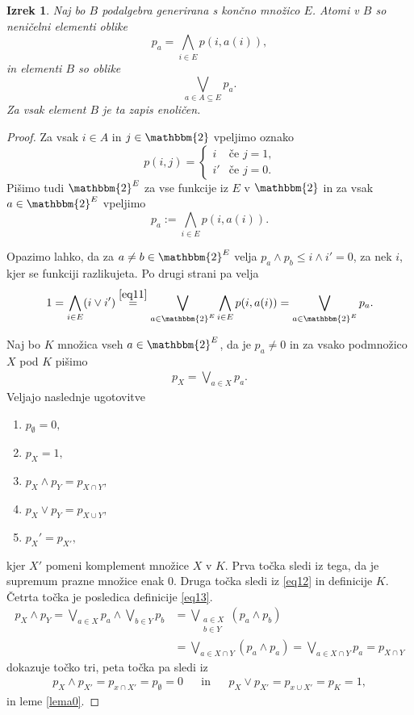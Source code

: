 \documentclass{amsart}
\newtheorem{izrek}{Izrek}[section]
\begin{document}
\begin{izrek}
    Naj bo $B$ podalgebra generirana s končno množico $E$.
    Atomi v $B$ so neničelni elementi oblike 
    $$p_a = \bigwedge_{i\in E} p(i, a(i)),$$
    in elementi $B$ so oblike 
    \[\bigvee_{a \in A \subseteq E} p_a.\]
    Za vsak element $B$ je ta zapis enoličen.
\end{izrek}

\begin{proof}
    Za vsak \(i\in A\) in \(j \in \mathbbm{2}\) vpeljimo oznako 
    \[p(i,j) = 
    \begin{cases}
        i & \text{če $j = 1$,} \\
        i' & \text{če $j = 0$.}
    \end{cases}\]
    Pišimo tudi \(\mathbbm{2}^{E}\) za vse funkcije iz 
    $E$ v $\mathbbm{2}$ in za vsak \(a \in \mathbbm{2}^{E}\) vpeljimo
    \[p_a := \bigwedge_{i \in E} p(i, a(i)).\]

    Opazimo lahko, da za $a\neq b \in \mathbbm{2}^{E}$ velja 
    $p_a \wedge p_b \leq i\wedge i'  = 0$, za nek $i$, kjer se funkciji razlikujeta.
    Po drugi strani pa velja
    \begin{align}
        \label{eq12}
        1 = \bigwedge_{i \in E} (i \vee i') \stackrel{\eqref{eq11}}{=} \bigvee_{a \in \mathbbm{2}^{E}} 
        \bigwedge_{i \in E} p(i, a(i)) = \bigvee_{a \in \mathbbm{2}^{E}} p_a.
    \end{align}

    Naj bo $K$ množica vseh \(a \in \mathbbm{2}^{E}\), da je \(p_a \neq 0\) in za vsako
    podmnožico $X$ pod $K$ pišimo 
    \begin{align}
        \label{eq13}
        p_X = \bigvee_{a\in X}p_a.
    \end{align}
    Veljajo naslednje ugotovitve
    \begin{enumerate}
        \item $p_\emptyset = 0,$
        \item $p_X = 1,$
        \item $p_X \wedge p_Y = p_{X\cap Y},$
        \item $p_X \vee p_Y = p_{X\cup Y},$
        \item $p_X' = p_{X'},$
    \end{enumerate}
    kjer $X'$ pomeni komplement množice $X$ v $K$. Prva točka sledi iz tega, da je
    supremum prazne množice enak $0$. Druga točka sledi iz \eqref{eq12} in definicije $K$.
    Četrta točka je posledica definicije \eqref{eq13}.
    \begin{align*}
        p_X \wedge p_Y = \bigvee_{a\in X}p_a \wedge \bigvee_{b\in Y}p_b &= 
        \bigvee_{\substack{a\in X \\ b\in Y}} (p_a\wedge p_b)\\
        &= \bigvee_{a\in X \cap Y} (p_a\wedge p_a) = \bigvee_{a\in X \cap Y} p_a = p_{X\cap Y}
    \end{align*}
    dokazuje točko tri, peta točka pa sledi iz
    \begin{align*}
        p_X\wedge p_{X'} = p_{x\cap X'} = p_\emptyset = 0 && \text{in}&& p_X\vee p_{X'} = p_{x\cup X'} = p_K = 1,
    \end{align*}
    in leme \ref*{lema0}.


\end{proof}
\end{document}
